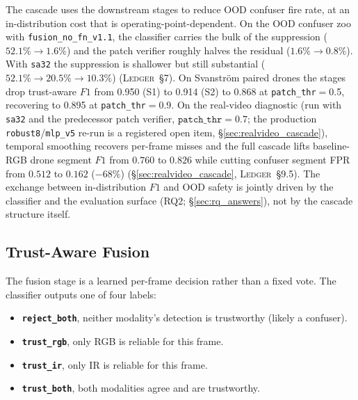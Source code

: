 The cascade uses the downstream stages to reduce OOD confuser fire rate, at an in-distribution cost that is operating-point-dependent. On the OOD confuser zoo with \texttt{fusion\_no\_fn\_v1.1}, the classifier carries the bulk of the suppression ($52.1\% \to 1.6\%$) and the patch verifier roughly halves the residual ($1.6\% \to 0.8\%$). With \texttt{sa32} the suppression is shallower but still substantial ($52.1\% \to 20.5\% \to 10.3\%$) (\textsc{Ledger}~\S7). On Svanstr\"om paired drones the stages drop trust-aware $F1$ from 0.950 (S1) to 0.914 (S2) to 0.868 at \texttt{patch\_thr}$=$0.5, recovering to 0.895 at \texttt{patch\_thr}$=$0.9. On the real-video diagnostic (run with \texttt{sa32} and the predecessor patch verifier, $\mathtt{patch\_thr}=0.7$; the production \texttt{robust8}/\texttt{mlp\_v5} re-run is a registered open item, \S\ref{sec:realvideo_cascade}), temporal smoothing recovers per-frame misses and the full cascade lifts baseline-RGB drone segment $F1$ from $0.760$ to $0.826$ while cutting confuser segment FPR from $0.512$ to $0.162$ ($-68\%$) (\S\ref{sec:realvideo_cascade}, \textsc{Ledger}~\S9.5). The exchange between in-distribution $F1$ and OOD safety is jointly driven by the classifier and the evaluation surface (RQ2; \S\ref{sec:rq_answers}), not by the cascade structure itself.

\subsection{Trust-Aware Fusion}
\label{sec:trust_fusion}

The fusion stage is a learned per-frame decision rather than a fixed vote. The classifier outputs one of four labels:

\begin{itemize}
    \item \textbf{\texttt{reject\_both}}, neither modality's detection is trustworthy (likely a confuser).
    \item \textbf{\texttt{trust\_rgb}}, only RGB is reliable for this frame.
    \item \textbf{\texttt{trust\_ir}}, only IR is reliable for this frame.
    \item \textbf{\texttt{trust\_both}}, both modalities agree and are trustworthy.
\end{itemize}

